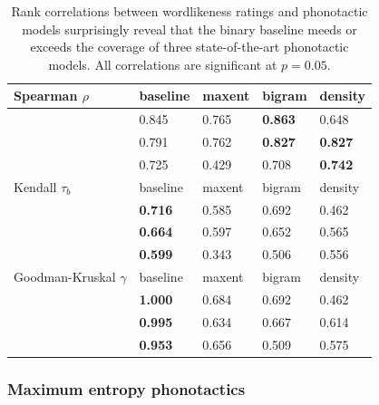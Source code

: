 \begin{table} \centering
\begin{tabular}{l l l l l}
\toprule
Spearman $\rho$          & baseline         & maxent  & bigram           & density          \\
\midrule
\citealt{Greenberg1964}  & {0.845}          & {0.765} & {\textbf{0.863}} & {0.648}          \\
\citealt{Scholes1966}    & {0.791}          & {0.762} & {\textbf{0.827}} & {\textbf{0.827}} \\
\citealt{Albright2003b}  & {0.725}          & {0.429} & {0.708}          & {\textbf{0.742}} \\
\midrule
Kendall $\tau_b$         & baseline         & maxent  & bigram           & density          \\
\midrule
\citealt{Greenberg1964}  & {\textbf{0.716}} & {0.585} & {0.692}          & {0.462}          \\
\citealt{Scholes1966}    & {\textbf{0.664}} & {0.597} & {0.652}          & {0.565}          \\
\citealt{Albright2003b}  & {\textbf{0.599}} & {0.343} & {0.506}          & {0.556}          \\
\midrule
Goodman-Kruskal $\gamma$ & baseline         & maxent  & bigram           & density          \\
\midrule
\citealt{Greenberg1964}  & {\textbf{1.000}} & {0.684} & {0.692}          & {0.462}          \\
\citealt{Scholes1966}    & {\textbf{0.995}} & {0.634} & {0.667}          & {0.614}          \\
\citealt{Albright2003b}  & {\textbf{0.953}} & {0.656} & {0.509}          & {0.575}          \\
\bottomrule
\end{tabular}
\caption{Rank correlations between wordlikeness ratings and phonotactic models surprisingly reveal that the binary baseline meeds or exceeds the coverage of three state-of-the-art phonotactic models. All correlations are significant at $p = 0.05$.}
\label{cor}
\end{table}


\subsubsection{Maximum entropy phonotactics}

